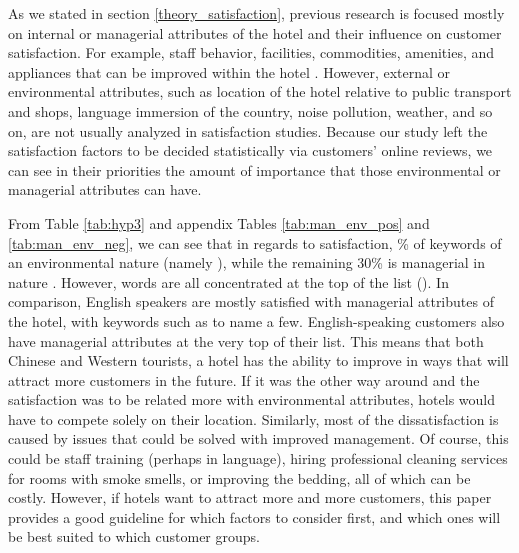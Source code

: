 As we stated in section \ref{theory_satisfaction}, previous research is focused mostly on internal or managerial attributes of the hotel and their influence on customer satisfaction. For example, staff behavior, facilities, commodities, amenities, and appliances that can be improved within the hotel \cite[e.g.][]{shanka2004, choi2001}. However, external or environmental attributes, such as location of the hotel relative to public transport and shops, language immersion of the country, noise pollution, weather, and so on, are not usually analyzed in satisfaction studies. Because our study left the satisfaction factors to be decided statistically via customers' online reviews, we can see in their priorities the amount of importance that those environmental or managerial attributes can have. 

From Table \ref{tab:hyp3} and appendix Tables \ref{tab:man_env_pos} and \ref{tab:man_env_neg}, we can see that in regards to satisfaction, \DIFdelbegin {}\% of keywords \DIFaddbegin {}\DIFaddend of an environmental nature (namely \DIFdelbegin {}\DIFdelend \DIFaddbegin {}\DIFaddend ), while the remaining 30\% is managerial in nature \DIFaddbegin {}\DIFaddend . However, \DIFdelbegin {}\DIFdelend \DIFaddbegin {}\DIFaddend words are all concentrated at the top of the list (\DIFdelbegin {}\DIFdelend \DIFaddbegin {}\DIFaddend ). In comparison, English speakers are mostly satisfied with managerial attributes of the hotel, with keywords such as \DIFdelbegin {}\DIFdelend \DIFaddbegin {}\DIFaddend to name a few. English-speaking customers also have managerial attributes at the very top of their list. This means that \DIFdelbegin {}\DIFdelend \DIFaddbegin {}\DIFaddend both Chinese and Western tourists, a hotel has the ability to improve in ways that will attract more customers in the future. If it was the other way around and the satisfaction was to be related more with environmental attributes, hotels would have to compete solely on their location. Similarly, most of the dissatisfaction is caused by issues that could be solved with improved management. Of course, this could be staff training (perhaps in language), hiring professional cleaning services for rooms with smoke smells, or improving the bedding, all of which can be costly. However, if hotels want to attract more and more customers, this paper provides a good guideline for which factors to consider first, and which ones will be best suited to which customer groups.

